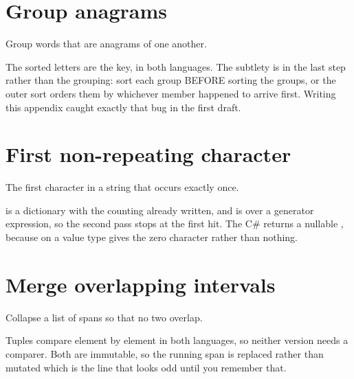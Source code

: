 \section{Group anagrams}
\label{sec:appD-anagrams}

\noindent
Group words that are anagrams of one another.



\noindent
The sorted letters are the key, in both languages. The subtlety is in the last step rather than the grouping: sort each group BEFORE sorting the groups, or the outer sort orders them by whichever member happened to arrive first. Writing this appendix caught exactly that bug in the first draft.

\section{First non-repeating character}
\label{sec:appD-first-unique}

\noindent
The first character in a string that occurs exactly once.



\noindent
{} is a dictionary with the counting already written, and  is  over a generator expression, so the second pass stops at the first hit. The C\# returns a nullable , because  on a value type gives the zero character rather than nothing.

\section{Merge overlapping intervals}
\label{sec:appD-merge}

\noindent
Collapse a list of spans so that no two overlap.



\noindent
Tuples compare element by element in both languages, so neither version needs a comparer. Both are immutable, so the running span is replaced rather than mutated \dash{} which is the line that looks odd until you remember that.

